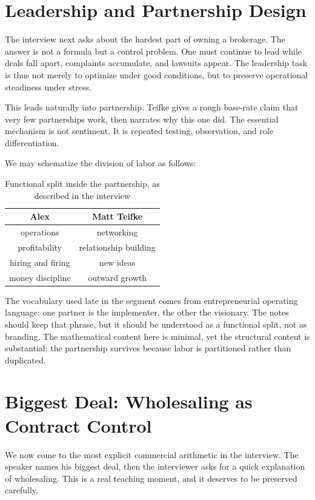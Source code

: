 \section{Leadership and Partnership Design}

The interview next asks about the hardest part of owning a brokerage. The answer is not a formula but a control problem. One must continue to lead while deals fall apart, complaints accumulate, and lawsuits appear. The leadership task is thus not merely to optimize under good conditions, but to preserve operational steadiness under stress.

This leads naturally into partnership. Teifke gives a rough base-rate claim that very few partnerships work, then narrates why this one did. The essential mechanism is not sentiment. It is repeated testing, observation, and role differentiation.

We may schematize the division of labor as follows:
\begin{table}[h]
\centering
\caption{Functional split inside the partnership, as described in the interview}
\begin{tabular}{|c|c|}
\hline
Alex & Matt Teifke \\
\hline
operations & networking \\
profitability & relationship building \\
hiring and firing & new ideas \\
money discipline & outward growth \\
\hline
\end{tabular}
\end{table}

The vocabulary used late in the segment comes from entrepreneurial operating language: one partner is the implementer, the other the visionary. The notes should keep that phrase, but it should be understood as a functional split, not as branding. The mathematical content here is minimal, yet the structural content is substantial: the partnership survives because labor is partitioned rather than duplicated.

\section{Biggest Deal: Wholesaling as Contract Control}

We now come to the most explicit commercial arithmetic in the interview. The speaker names his biggest deal, then the interviewer asks for a quick explanation of wholesaling. This is a real teaching moment, and it deserves to be preserved carefully.

